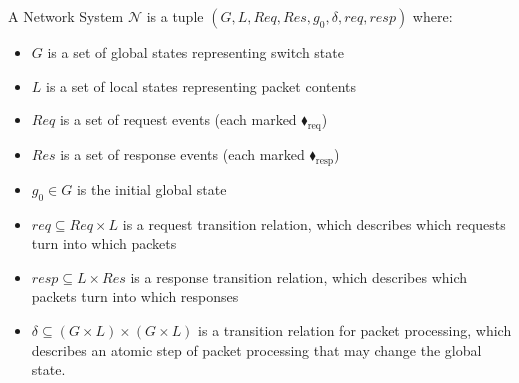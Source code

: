 A Network System $\mathcal{N}$ is a tuple $(G, L, \mathit{Req}, \mathit{Res}, g_0, \delta, \mathit{req}, \mathit{resp})$ where:
\begin{itemize}
\item $G$ is a set of global states representing switch state
\item $L$ is a set of local states representing packet contents
\item $\mathit{Req}$ is a set of request events (each marked {\color{ForestGreen}$\blacklozenge_\text{req}$})
\item $\mathit{Res}$ is a set of response events (each marked {\color{red}$\blacklozenge_\text{resp}$})
\item $g_0 \in G$ is the initial global state
\item $\mathit{req} \subseteq \mathit{Req} \times L$ is a request transition relation, which describes which requests turn into which packets
\item $\mathit{resp} \subseteq L \times \mathit{Res}$ is a response transition relation, which describes which packets turn into which responses
\item $\delta \subseteq (G \times L) \times (G \times L)$ is a transition relation for packet processing, which describes an atomic step of packet processing that may change the global state.
\end{itemize}

